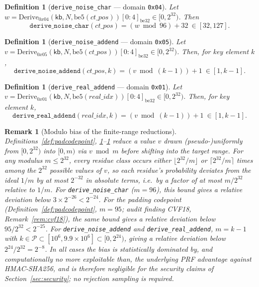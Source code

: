 \documentclass[11pt,a4paper]{article}
\newtheorem{definition}[theorem]{Definition}
\newtheorem{remark}[theorem]{Remark}
\begin{document}
\begin{definition}[\texttt{derive\_noise\_char} --- domain \texttt{0x04}]
\label{def:noisechar}
Let $w = \mathrm{Derive}_{0x04}(\mathsf{kb}, N, \mathrm{be5}(ct\_pos))[0{:}4]_{\mathrm{be32}} \in [0,2^{32})$. Then
\[
  \texttt{derive\_noise\_char}(ct\_pos) = (w \bmod 96) + 32 \ \in [32,127].
\]
\end{definition}

\begin{definition}[\texttt{derive\_noise\_addend} --- domain \texttt{0x05}]
\label{def:noiseaddend}
Let $v = \mathrm{Derive}_{0x05}(\mathsf{kb}, N, \mathrm{be5}(ct\_pos))[0{:}4]_{\mathrm{be32}} \in [0,2^{32})$. Then, for key element $k$,
\[
  \texttt{derive\_noise\_addend}(ct\_pos, k) = (v \bmod (k-1)) + 1 \ \in [1, k-1].
\]
\end{definition}

\begin{definition}[\texttt{derive\_real\_addend} --- domain \texttt{0x01}]
\label{def:realaddend}
Let $v = \mathrm{Derive}_{0x01}(\mathsf{kb}, N, \mathrm{be5}(real\_idx))[0{:}4]_{\mathrm{be32}} \in [0,2^{32})$. Then, for key element $k$,
\[
  \texttt{derive\_real\_addend}(real\_idx, k) = (v \bmod (k-1)) + 1 \ \in [1, k-1].
\]
\end{definition}

\begin{remark}[Modulo bias of the finite-range reductions]
\label{rem:modbias}
Definitions~\ref{def:padcodepoint}, \ref{def:noisechar}--\ref{def:realaddend}
reduce a value $v$ drawn (pseudo-)uniformly from $[0,2^{32})$ into $[0,m)$ via
$v \bmod m$ before shifting into the target range. For any modulus
$m \le 2^{32}$, every residue class occurs either
$\lfloor 2^{32}/m \rfloor$ or $\lceil 2^{32}/m \rceil$ times among the
$2^{32}$ possible values of $v$, so each residue's probability deviates
from the ideal $1/m$ by at most $2^{-32}$ in absolute terms, i.e.\ by a
factor of at most $m/2^{32}$ relative to $1/m$. For
\texttt{derive\_noise\_char} ($m = 96$), this bound gives a relative
deviation below $3 \times 2^{-26} < 2^{-24}$. For the padding codepoint
(Definition~\ref{def:padcodepoint}, $m = 95$; audit finding CVF18,
Remark~\ref{rem:cvf18}), the same bound gives a relative deviation below
$95/2^{32} < 2^{-25}$. For \texttt{derive\_noise\_addend} and
\texttt{derive\_real\_addend}, $m = k - 1$ with $k \in \mathcal{P}
\subset [10^6, 9.9\times 10^6] \subset [0, 2^{24})$, giving a relative
deviation below $2^{24}/2^{32} = 2^{-8}$. In all cases the bias is
statistically dominated by, and computationally no more exploitable
than, the underlying PRF advantage against HMAC-SHA256, and is therefore
negligible for the security claims of Section~\ref{sec:security}; no
rejection sampling is required.
\end{remark}
\end{document}
